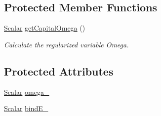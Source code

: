 \subsection*{Protected Member Functions}
\begin{DoxyCompactItemize}
\item 
\mbox{\hyperlink{class_vel_indep_particles_a5d275b22f0d759f360ddd80e78f4b466}{Scalar}} \mbox{\hyperlink{class_regu_particles_aee55f0e2663334407455761a49abd087}{get\+Capital\+Omega}} ()
\begin{DoxyCompactList}\small\item\em Calculate the regularized variable Omega. \end{DoxyCompactList}\end{DoxyCompactItemize}
\subsection*{Protected Attributes}
\begin{DoxyCompactItemize}
\item 
\mbox{\hyperlink{class_vel_indep_particles_a5d275b22f0d759f360ddd80e78f4b466}{Scalar}} \mbox{\hyperlink{class_regu_particles_ab977f3d2781b5673d4c9b8cf329dcbbc}{omega\+\_\+}}
\item 
\mbox{\hyperlink{class_vel_indep_particles_a5d275b22f0d759f360ddd80e78f4b466}{Scalar}} \mbox{\hyperlink{class_regu_particles_ac8d1a8a252e1c0ce19bc0b1ca55742bb}{bind\+E\+\_\+}}
\end{DoxyCompactItemize}
